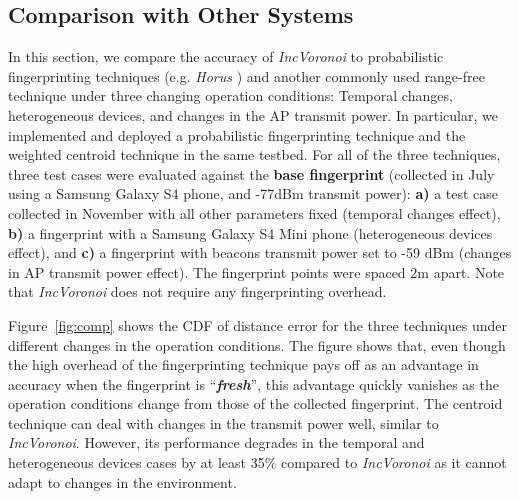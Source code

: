 \documentclass[conference]{IEEEtran}
\def \sys {\textit{IncVoronoi}}
\begin{document}
\subsection{Comparison with Other Systems}
In this section, we compare the accuracy of \sys{} to probabilistic fingerprinting techniques (e.g. \emph{Horus} \cite{youssef2005horus}) 
 and another commonly used range-free technique under three changing operation conditions: Temporal changes, heterogeneous devices, and changes in the AP transmit power. In particular, we implemented and deployed 
a probabilistic fingerprinting technique \cite{youssef2005horus} and the weighted centroid technique \cite{blumenthal2007weighted} in the same testbed. For all of the three techniques, three test cases were evaluated against the \textbf{base fingerprint} (collected in July 
using a Samsung Galaxy S4 phone, and \mbox{-77dBm} transmit power): \textbf{a)} a test case collected in November 
with all other parameters fixed (temporal changes effect), \textbf{b)} a fingerprint with a Samsung Galaxy S4 Mini phone (heterogeneous devices effect), and \textbf{c)} a fingerprint with beacons transmit power set to -59 dBm (changes in AP transmit power effect). 
The fingerprint points were spaced 2m apart. Note that \sys{} does not require any fingerprinting overhead.

\begin{figure*}[!t]
\centering
    \hfill
    \hfill
\caption{Performance comparison of \sys{} against the probabilistic fingerprinting and the centroid techniques under \textbf{three} operational environment changes. 
\sys{} performance is robust against changes compared to the other two systems.}
\label{fig:comp}
\end{figure*}
Figure~\ref{fig:comp} shows the CDF of distance error for the three techniques under different changes in the operation conditions. 
The figure shows that, even though the high overhead of the fingerprinting technique pays off as an advantage in accuracy when the fingerprint is ``\textbf{\emph{fresh}}'', this advantage quickly vanishes as the operation conditions change from those of the collected fingerprint.
The centroid technique can deal with changes in the transmit power well, similar to \sys{}. However, its performance degrades in the temporal and heterogeneous devices cases by at least 35\% compared to \sys{} as it cannot adapt to changes in the environment.
\end{document}
